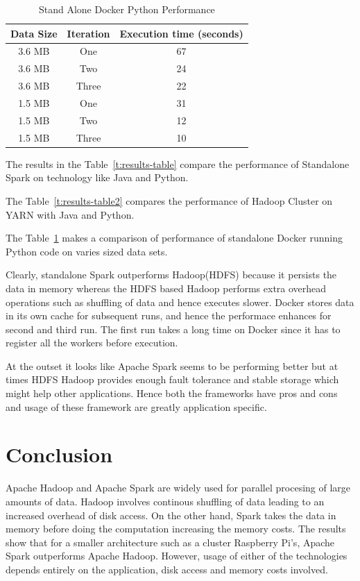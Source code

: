 \begin{table}[hbt]
\centering
\caption{Stand Alone Docker Python Performance}\label{t:results-table3}
    \begin{tabular}{ | c | c | c |}
    \hline
    Data Size & Iteration & Execution time (seconds) \\ \hline
    3.6 MB & One & 67  \\ \hline
    3.6 MB & Two & 24 \\ \hline
    3.6 MB & Three & 22 \\ \hline
    1.5 MB & One & 31  \\ \hline
    1.5 MB & Two & 12 \\ \hline
    1.5 MB & Three & 10 \\ \hline
    \end{tabular}
\end{table}


The results in the Table~\ref{t:results-table} compare the performance of
Standalone Spark on technology like Java and Python. 

The Table~\ref{t:results-table2} compares the performance of Hadoop Cluster on
YARN with Java and Python.

The Table~\ref{t:results-table3} makes a comparison of performance of standalone
Docker running Python code on varies sized data sets.

 Clearly, standalone Spark outperforms Hadoop(HDFS) because it persists 
 the data in memory whereas the HDFS based Hadoop performs extra overhead 
 operations such as shuffling of data and hence executes slower. 
 Docker stores data in its own cache for subsequent runs, and hence the 
 performace enhances for second and third run. The first run takes a long time 
 on Docker since it has to register all the workers before execution.

 At the outset it looks like Apache Spark seems to be performing better but at 
 times HDFS Hadoop provides enough fault tolerance and stable storage which 
 might help other applications. Hence both the frameworks have pros and cons and
 usage of these framework are greatly application specific. 


\section{Conclusion}
Apache Hadoop and Apache Spark are widely used for parallel procesing of large 
amounts of data. Hadoop involves continous shuffling of data leading to an
increased overhead of disk access. On the other hand, Spark takes the data in 
memory before doing the computation increasing the memory costs. The results
show that for a smaller architecture such as a cluster Raspberry Pi's, Apache 
Spark outperforms Apache Hadoop. However, usage of either of the technologies 
depends entirely on the application, disk access and memory costs involved.


